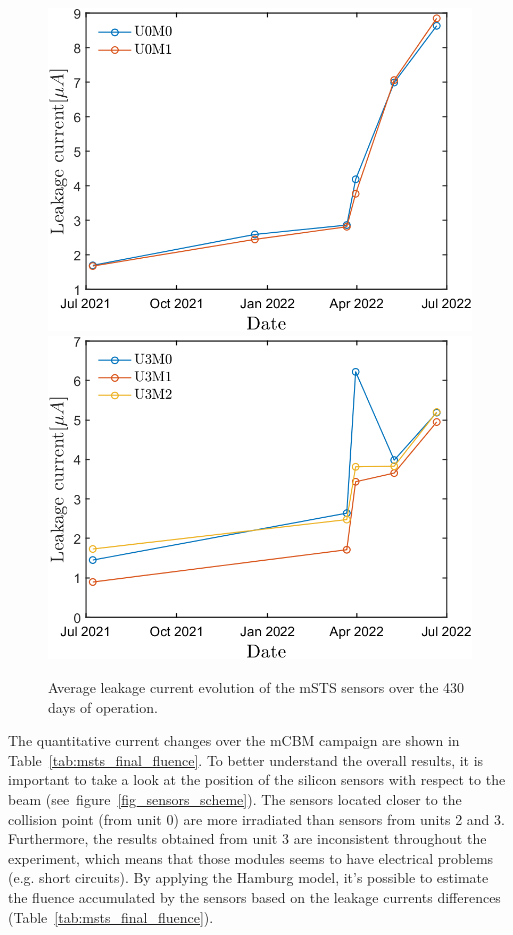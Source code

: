 \begin{figure}[!h]
\centering
\includegraphics[width=0.48\columnwidth]{Chapter6/DCS/images/sensors/U0_leakage.png}
\includegraphics[width=0.48\columnwidth]{Chapter6/DCS/images/sensors/U3_leakage.png}
\caption{Average leakage current evolution of the \gls{mSTS} sensors over the 430 days of operation. }
\label{fig_leak}
\end{figure}

\newpage
The quantitative current changes over the \gls{mCBM} campaign are shown in Table~\ref{tab:msts_final_fluence}. To better understand the overall results, it is important to take a look at the position of the silicon sensors with respect to the beam (see~figure~\ref{fig_sensors_scheme}). The sensors located closer to the collision point (from unit 0) are more irradiated than sensors from units 2 and 3. Furthermore, the results obtained from unit 3 are inconsistent throughout the experiment, which means that those modules seems to have electrical problems (e.g. short circuits). By applying the Hamburg model, it's possible to estimate the fluence accumulated by the sensors based on the leakage currents differences (Table~\ref{tab:msts_final_fluence}). 


